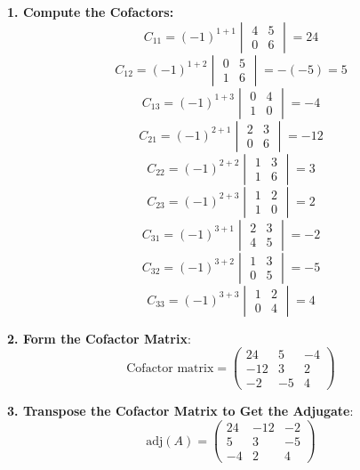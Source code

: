 \documentclass[12pt]{article}
\begin{document}
\textbf{1. Compute the Cofactors:}
   \[
   C_{11} = (-1)^{1+1} \begin{vmatrix} 4 & 5 \\ 0 & 6 \end{vmatrix} = 24
   \]
   \[
   C_{12} = (-1)^{1+2} \begin{vmatrix} 0 & 5 \\ 1 & 6 \end{vmatrix} = -(-5) = 5
   \]
   \[
   C_{13} = (-1)^{1+3} \begin{vmatrix} 0 & 4 \\ 1 & 0 \end{vmatrix} = -4
   \]
   \[
   C_{21} = (-1)^{2+1} \begin{vmatrix} 2 & 3 \\ 0 & 6 \end{vmatrix} = -12
   \]
   \[
   C_{22} = (-1)^{2+2} \begin{vmatrix} 1 & 3 \\ 1 & 6 \end{vmatrix} = 3
   \]
   \[
   C_{23} = (-1)^{2+3} \begin{vmatrix} 1 & 2 \\ 1 & 0 \end{vmatrix} = 2
   \]
   \[
   C_{31} = (-1)^{3+1} \begin{vmatrix} 2 & 3 \\ 4 & 5 \end{vmatrix} = -2
   \]
   \[
   C_{32} = (-1)^{3+2} \begin{vmatrix} 1 & 3 \\ 0 & 5 \end{vmatrix} = -5
   \]
   \[
   C_{33} = (-1)^{3+3} \begin{vmatrix} 1 & 2 \\ 0 & 4 \end{vmatrix} = 4
   \]

\textbf{2. Form the Cofactor Matrix}:
   \[
   \text{Cofactor matrix} = \begin{pmatrix} 24 & 5 & -4 \\ -12 & 3 & 2 \\ -2 & -5 & 4 \end{pmatrix}
   \]

\textbf{3. Transpose the Cofactor Matrix to Get the Adjugate}:
   \[
   \text{adj}(A) = \begin{pmatrix} 24 & -12 & -2 \\ 5 & 3 & -5 \\ -4 & 2 & 4 \end{pmatrix}
   \]
\end{document}
